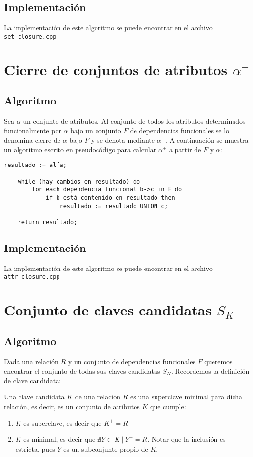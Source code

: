 \documentclass{article}
\begin{document}
\subsection{Implementación}
La implementación de este algoritmo se puede encontrar en el archivo \verb|set_closure.cpp|

\newpage
\section{Cierre de conjuntos de atributos $\alpha^{+}$}
\subsection{Algoritmo}
Sea $\alpha$ un conjunto de atributos. Al conjunto de todos los atributos determinados funcionalmente por $\alpha$ bajo un conjunto $F$ de dependencias funcionales se lo denomina cierre de $\alpha$ bajo $F$ y se denota mediante $\alpha^{+}$. A continuación se muestra un algoritmo escrito en pseudocódigo para calcular $\alpha^{+}$ a partir de $F$ y $\alpha$:

\begin{Verbatim}[frame=single]
    resultado := alfa;
    
    while (hay cambios en resultado) do
        for each dependencia funcional b->c in F do
            if b está contenido en resultado then
                resultado := resultado UNION c;
    
    return resultado;
\end{Verbatim}

\subsection{Implementación}
La implementación de este algoritmo se puede encontrar en el archivo \verb|attr_closure.cpp|


\newpage
\section{Conjunto de claves candidatas $S_{K}$}
\subsection{Algoritmo}
Dada una relación $R$ y un conjunto de dependencias funcionales $F$ queremos encontrar el conjunto de todas sus claves candidatas $S_{K}$. Recordemos la definición de clave candidata:

Una clave candidata $K$ de una relación $R$ es una superclave minimal para dicha relación, es decir, es un conjunto de atributos $K$ que cumple:
\begin{enumerate}
    \item $K$ es superclave, es decir que $K^{+} = R$
    \item $K$ es minimal, es decir que  $\nexists Y \subset K\ |\ Y^{+} = R$. Notar que la inclusión es estricta, pues $Y$ es un subconjunto propio de $K$.
\end{enumerate}
\end{document}
